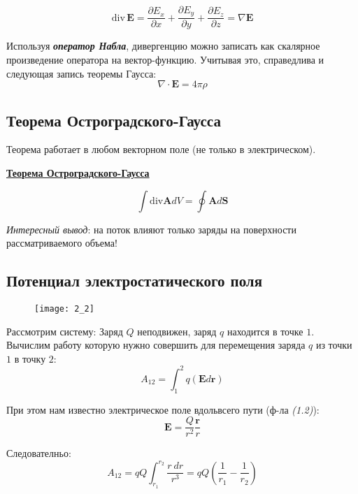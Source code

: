 \begin{equation}\label{opr3}
\mathrm{div\,}\textbf{E} = \frac{\partial E_x}{\partial x} + \frac{\partial E_y}{\partial y} + \frac{\partial E_z}{\partial z} = \nabla \mathbf{E}
\end{equation}

Используя \textit{\textbf{оператор Набла}}, дивергенцию можно записать как скалярное произведение оператора на вектор-функцию. Учитывая это, справедлива и следующая запись теоремы Гаусса:
\begin{equation}\label{opr4}
\nabla \cdot \textbf{E} = 4 \pi \rho
\end{equation}

\subsection{Теорема Остроградского-Гаусса}
Теорема работает в любом векторном поле (не только в электрическом).

\colorbox{faded}{\underline{\textbf{Теорема Остроградского-Гаусса}}}

\begin{equation}
	\int \mathrm{div} \textbf{A} dV = \oint \textbf{A} d\textbf{S}
\end{equation}

\textit{Интересный вывод}: на поток влияют только заряды на поверхности рассматриваемого объема!

\subsection{Потенциал электростатического поля}

\begin{figure}[!ht]
\centering
 \texttt{[image: 2\_2]}     
 \label{fig:my_label}
 \caption{}
\end{figure}

Рассмотрим систему: Заряд $Q$ неподвижен, заряд $q$ находится в точке $1$. Вычислим работу которую нужно совершить для перемещения заряда $q$ из точки $1$ в точку $2$:
\begin{equation}
A_{12} = \int_{1}^{2} q(\textbf{E} d \textbf{r})
\end{equation}

При этом нам известно электрическое поле вдольвсего пути (ф-ла \textit{(1.2)}):
$$\mathbf{E} = \frac{Q}{r^2} \frac{\mathbf{r}}{r}$$

Следователньо:
\begin{equation}
A_{12} = qQ \int_{r_{1}}^{r_{2}} \frac{r ~dr}{r^3} = qQ \left( \frac{1}{r_{1}} - \frac{1}{r_{2}}\right)
\end{equation} 

